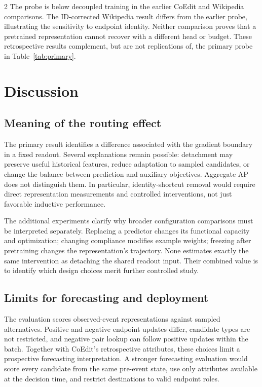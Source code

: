 \documentclass[a4paper,10pt,fleqn]{article}
\begin{document}
\begin{multicols}{2}
The probe is below decoupled training in the earlier CoEdit and Wikipedia comparisons. The ID-corrected Wikipedia result differs from the earlier probe, illustrating the sensitivity to endpoint identity. Neither comparison proves that a pretrained representation cannot recover with a different head or budget. These retrospective results complement, but are not replications of, the primary probe in Table~\ref{tab:primary}.

\section{Discussion}
\subsection{Meaning of the routing effect}
The primary result identifies a difference associated with the gradient boundary in a fixed readout. Several explanations remain possible: detachment may preserve useful historical features, reduce adaptation to sampled candidates, or change the balance between prediction and auxiliary objectives. Aggregate AP does not distinguish them. In particular, identity-shortcut removal would require direct representation measurements and controlled interventions, not just favorable inductive performance.

The additional experiments clarify why broader configuration comparisons must be interpreted separately. Replacing a predictor changes its functional capacity and optimization; changing compliance modifies example weights; freezing after pretraining changes the representation's trajectory. None estimates exactly the same intervention as detaching the shared readout input. Their combined value is to identify which design choices merit further controlled study.

\subsection{Limits for forecasting and deployment}
The evaluation scores observed-event representations against sampled alternatives. Positive and negative endpoint updates differ, candidate types are not restricted, and negative pair lookup can follow positive updates within the batch. Together with CoEdit's retrospective attributes, these choices limit a prospective forecasting interpretation. A stronger forecasting evaluation would score every candidate from the same pre-event state, use only attributes available at the decision time, and restrict destinations to valid endpoint roles.


\end{multicols}
\end{document}
